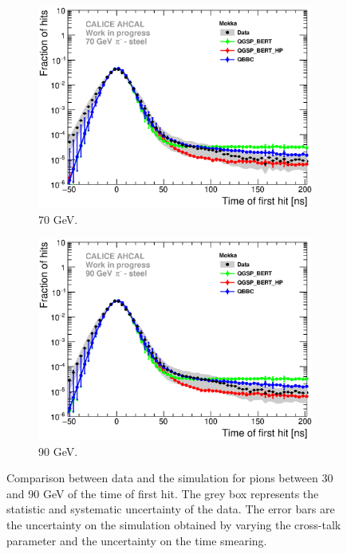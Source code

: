 \begin{figure}[htbp!]
\begin{subfigure}[t]{0.49\textwidth}
    \centering
    \includegraphics[width=1\textwidth]{../Thesis_Plots/Timing/Pions/Plots/ComparisonToSim/Comparison_SimData_Pion70GeV_LateClusters.eps}
    \caption{70 GeV.} \label{fig:dNdt_SimData_70GeV}
  \end{subfigure}
  \hfill
  \begin{subfigure}[t]{0.49\textwidth}
    \centering
    \includegraphics[width=1\textwidth]{../Thesis_Plots/Timing/Pions/Plots/ComparisonToSim/Comparison_SimData_Pion90GeV_LateClusters.eps}
    \caption{90 GeV.} \label{fig:dNdt_SimData_90GeV}
  \end{subfigure}
  \caption{Comparison between data and the \mokka simulation for pions between 30 and 90 GeV of the time of first hit. The grey box represents the statistic and systematic uncertainty of the data. The error bars are the uncertainty on the \mokka simulation obtained by varying the cross-talk parameter and the uncertainty on the time smearing.}
\end{figure}

